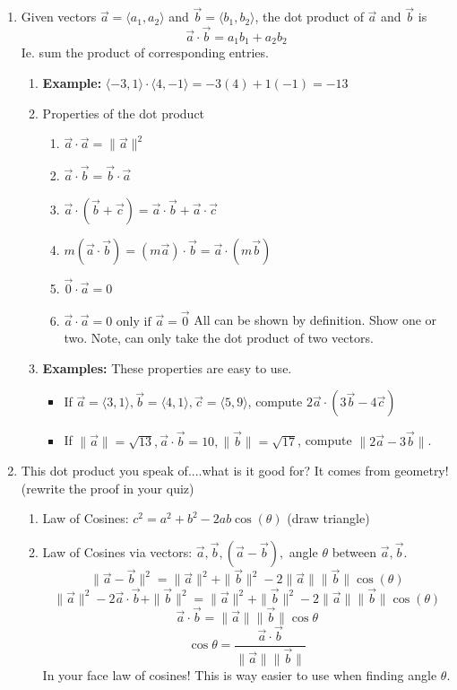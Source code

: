 \documentclass{article}
\begin{document}
\begin{enumerate}

\item Given vectors $\vec{a} = \langle a_1,a_2 \rangle$ and $\vec{b} = \langle b_1,b_2 \rangle$, the dot product of $\vec{a}$ and $\vec{b}$ is
\[
\vec{a} \cdot \vec{b} = a_1b_1 + a_2b_2
\]
Ie. sum the product of corresponding entries.
\begin{enumerate}
\item {\bf Example:} $\langle -3,1 \rangle \cdot \langle 4,-1 \rangle = -3(4)+1(-1)=-13$

\item Properties of the dot product
\begin{enumerate}
\item $\vec a\cdot \vec a = \|\vec a\|^2$
\item $\vec a\cdot\vec b = \vec b\cdot \vec a$ 
\item $\vec a\cdot(\vec b+\vec c) = \vec a\cdot \vec b+\vec a\cdot\vec c$
\item $m(\vec a\cdot \vec b) = (m\vec a)\cdot\vec b = \vec a\cdot(m\vec b)$
\item $\vec 0\cdot \vec a = 0$
\item $\vec a \cdot \vec{a}=0 \text{ only if } \vec{a}=\vec{0}$
All can be shown by definition. Show one or two. Note, can only take the dot product of two vectors. 
\end{enumerate}

\item {\bf Examples:} These properties are easy to use.
\begin{itemize}
\item If $\vec{a} = \langle 3,1 \rangle, \vec{b} = \langle 4,1 \rangle, \vec{c} = \langle 5,9 \rangle$, compute $2\vec{a} \cdot \left(3\vec{b}-4\vec{c} \right)$
\item If $\|\vec{a}\| = \sqrt{13}, \vec{a}\cdot \vec{b} = 10, \|\vec{b} \| = \sqrt{17}$, compute $\|2\vec{a} - 3 \vec{b}\|$.
\end{itemize}
\end{enumerate}

\item This dot product you speak of....what is it good for? It comes from geometry! (rewrite the proof in your quiz)
\begin{enumerate}
\item Law of Cosines: $c^2 = a^2 + b^2 - 2ab\cos(\theta)$ (draw triangle)
\item Law of Cosines via vectors: $\vec{a}, \vec{b}, (\vec{a}-\vec{b}),$ angle $\theta$ between $\vec{a},\vec{b}$.
\[
\| \vec{a} - \vec{b} \|^2 = \|\vec{a}\|^2 + \|\vec{b}\|^2 - 2\|\vec{a}\|\|\vec{b}\| \cos(\theta) 
\]
\[
\| \vec{a} \|^2 -2\vec{a}\cdot\vec{b}+ \|\vec{b} \|^2 = \|\vec{a}\|^2 + \|\vec{b}\|^2 - 2\|\vec{a}\|\|\vec{b}\| \cos(\theta) 
\]
\[
\vec a\cdot \vec b = \|\vec a\|\|\vec b\|\cos \theta
\]
\[
\cos \theta = \frac{\vec a\cdot \vec b}{\|\vec a\|\|\vec b\|} 
\]
In your face law of cosines! This is way easier to use when finding angle $\theta$.
\end{enumerate}


\end{enumerate}
\end{document}
